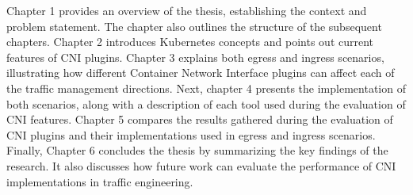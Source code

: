 Chapter 1 provides an overview of the thesis, establishing the context and problem statement. The chapter also outlines the structure of the subsequent chapters. Chapter 2 introduces Kubernetes concepts and points out current features of CNI plugins. Chapter 3 explains both egress and ingress scenarios, illustrating how different Container Network Interface plugins can affect each of the traffic management directions. Next, chapter 4 presents the implementation of both scenarios, along with a description of each tool used during the evaluation of CNI features. Chapter 5 compares the results gathered during the evaluation of CNI plugins and their implementations used in egress and ingress scenarios. Finally, Chapter 6 concludes the thesis by summarizing the key findings of the research. It also discusses how future work can evaluate the performance of CNI implementations in traffic engineering.

















